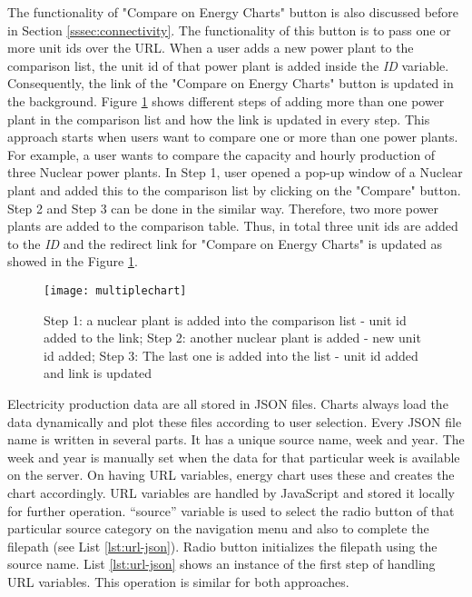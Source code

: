 The functionality of "Compare on Energy Charts" button is also discussed before in Section \ref{sssec:connectivity}. The functionality of this button is to pass one or more unit ids over the URL. When a user adds a new power plant to the comparison list, the unit id of that power plant is added inside the \textit{ID} variable. Consequently, the link of the "Compare on Energy Charts" button is updated in the background. Figure \ref{fig:stepsPP} shows different steps of adding more than one power plant in the comparison list and how the link is updated in every step. This approach starts when users want to compare one or more than one power plants. For example, a user wants to compare the capacity and hourly production of three Nuclear power plants. In Step 1, user opened a pop-up window of a Nuclear plant and added this to the comparison list by clicking on the "Compare" button. Step 2 and Step 3 can be done in the similar way. Therefore, two more power plants are added to the comparison table. Thus, in total three unit ids are added to the \textit{ID} and the redirect link for "Compare on Energy Charts" is updated as showed in the Figure \ref{fig:stepsPP}. 

\begin{figure}
\centering
\texttt{[image: multiplechart]}
\caption[Steps of adding power plants to the comparison list]{Step 1: a nuclear plant is added into the comparison list - unit id added to the link; Step 2: another nuclear plant is added - new unit id added; Step 3: The last one is added into the list - unit id added and link is updated}
\label{fig:stepsPP}
\end{figure}

Electricity production data are all stored in JSON files. Charts always load the data dynamically and plot these files according to user selection. Every JSON file name is written in several parts. It has a unique source name, week and year. The week and year is manually set when the data for that particular week is available on the server. On having URL variables, energy chart uses these and creates the chart accordingly. URL variables are handled by JavaScript and stored it locally for further operation. “source” variable is used to select the radio button of that particular source category on the navigation menu and also to complete the filepath (see List \ref{lst:url-json}). Radio button initializes the filepath using the source name. List \ref{lst:url-json} shows an instance of the first step of handling URL variables. This operation is similar for both approaches. 

